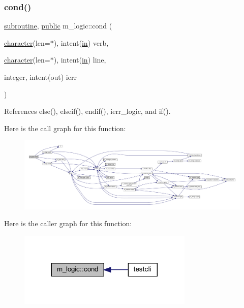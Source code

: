 \subsubsection{\texorpdfstring{cond()}{cond()}}
{\footnotesize\ttfamily \hyperlink{M__stopwatch_83_8txt_acfbcff50169d691ff02d4a123ed70482}{subroutine}, \hyperlink{M__stopwatch_83_8txt_a2f74811300c361e53b430611a7d1769f}{public} m\+\_\+logic\+::cond (\begin{DoxyParamCaption}\item[{\hyperlink{option__stopwatch_83_8txt_abd4b21fbbd175834027b5224bfe97e66}{character}(len=$\ast$), intent(\hyperlink{M__journal_83_8txt_afce72651d1eed785a2132bee863b2f38}{in})}]{verb,  }\item[{\hyperlink{option__stopwatch_83_8txt_abd4b21fbbd175834027b5224bfe97e66}{character}(len=$\ast$), intent(\hyperlink{M__journal_83_8txt_afce72651d1eed785a2132bee863b2f38}{in})}]{line,  }\item[{integer, intent(out)}]{ierr }\end{DoxyParamCaption})}



References else(), elseif(), endif(), ierr\+\_\+logic, and if().

Here is the call graph for this function\+:
\nopagebreak
\begin{figure}[H]
\begin{center}
\leavevmode
\includegraphics[width=350pt]{namespacem__logic_a169fe24f769ed7cd5336409c0722900e_cgraph}
\end{center}
\end{figure}
Here is the caller graph for this function\+:
\nopagebreak
\begin{figure}[H]
\begin{center}
\leavevmode
\includegraphics[width=236pt]{namespacem__logic_a169fe24f769ed7cd5336409c0722900e_icgraph}
\end{center}
\end{figure}
\mbox{\label{namespacem__logic_ac51075acbd12f22ae97edd87352cba67}} 
